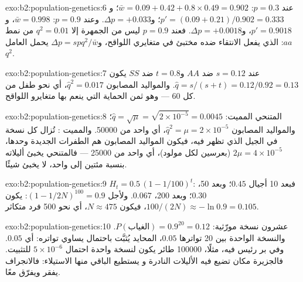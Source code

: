 \begin{solution}{exo:b2:population-genetics:6}
عند $p = 0.3$: $\bar w = 0.09 + 0.42 + 0.8\times 0.49 = 0.902$؛ و$p' =
(0.09 + 0.21)/0.902 = 0.333$؛ و$\Delta p = +0.033$. وعند $p = 0.9$: $\bar w
= 0.998$، و$p' = 0.9018$، و$\Delta p = +0.0018$. فعند $p = 0.9$ ليس من الجمهرة
إلا $q^{2} = 0.01$ من نمط $aa$:  الذي يفعل الانتقاء
ضده مختبئ في متغايري اللواقح، و$\Delta p = spq^{2}/\bar w$
يحمل العامل $q^{2}$.
\end{solution}

\begin{solution}{exo:b2:population-genetics:7}
عند $s = 0.12$ ضد $AA$ و$t = 0.8$ ضد $SS$ يكون $\hat q =
s/(s + t) = 0.12/0.92 = 0.13$. والمواليد المصابون $\hat q^{2} = 0.017$،
أي نحو طفل من كل 60 --- وهو ثمن الحماية التي
ينعم بها متغايرو اللواقح.
\end{solution}

\begin{solution}{exo:b2:population-genetics:8}
المتنحي المميت: $\hat q = \sqrt{\mu} = \sqrt{2\times 10^{-5}} =
0.0045$؛ والمواليد المصابون $\hat q^{2} = \mu = 2\times 10^{-5}$، أي واحد من
\num{50000}. والمميت : تُزال كل نسخة في
الجيل الذي تظهر فيه، فيكون المواليد المصابون هم الطفرات
الجديدة وحدها، $2\mu = 4\times 10^{-5}$ (بعرسين لكل مولود)، أي واحد من
\num{25000} --- فالمتنحي يخبئ أليلاته بنسبة مئتين إلى واحد،
 لا يخبئ شيئًا.
\end{solution}

\begin{solution}{exo:b2:population-genetics:9}
$H_t = 0.5\,(1 - 1/100)^{t}$: فبعد 10 أجيال $0.45$؛ وبعد 50،
$0.30$؛ وبعد 200، $0.067$. ولأجل $(1 - 1/2N)^{100} = 0.9$:
يكون $100/(2N) \approx -\ln 0.9 = 0.105$، فيكون $N \approx 475$، أي نحو 500
فرد متكاثر.
\end{solution}

\begin{solution}{exo:b2:population-genetics:10}
عشرون نسخة مورّثية: $P(\text{الغياب}) = 0.9^{20} = 0.12$. والنسخة
الواحدة بين 20 تواترها $0.05$،  المحايد يُثبَّت
باحتمال يساوي تواتره: أي $0.05$. وفي بر رئيس فيه، مثلًا،
\num{100000} طائر يكون لنسخة واحدة احتمال $5\times 10^{-6}$
للتثبيت. فالجزيرة مكان تضيع فيه الأليلات النادرة و
يستطيع الباقي منها الاستيلاء: فالانجراف يفقر ويفرّق معًا.
\end{solution}

